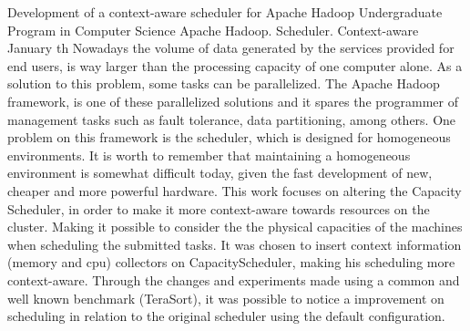 \documentclass[diss]{mdtufsm}
\begin{document}
\begin{abstract}
Hoje em dia, o volume de dados gerados é muito maior do que a capacidade de processamento dos computadores. Como solução para esse problema, algumas tarefas podem ser paralelizadas ou distribuidas. O \emph{framework Apache Hadoop} \cite{Hadoop}, é uma delas e poupa o programador as terefas de gerenciamento, como tolerância à falhas, particionamento dos dados entre outros.
Um problema no escalonador do \emph{Apache Hadoop} é que seu foco é em ambientes homogêneos, o que muitas vezes não é possível de se manter. O foco deste trabalho foi na melhora de um escalonador já existente, possuindo como objetivo torná-lo sensível ao contexto, permitindo que as capacidades físicas de cada máquina sejam consideradas na hora da distribuição das tarefas submetidas. Optou-se por inserir coletores de informações de contexto (memória e cpu) no  CapacityScheduler, tornando o comportamento desse sensível ao contexto. Através das mudanças feitas e de experimentos feitos usando um benchmark bem conhecido (TeraSort), foi possível demonstrar uma melhora no escalonamento em relação ao escalonador original com a configuração padrão.
\end{abstract}



\begin{englishabstract}
{Development of a context-aware scheduler for Apache Hadoop}
{Undergraduate Program in Computer Science}
{Apache Hadoop. Scheduler. Context-aware}
{January}
{th}
Nowadays the volume of data generated by the services provided for end users, is way larger than the processing capacity of one computer alone. As a solution to this problem, some tasks can be parallelized. The Apache Hadoop framework, is one of these parallelized solutions and it spares the programmer of management tasks such as fault tolerance, data partitioning, among others.
One problem on this framework is the scheduler, which is designed for homogeneous environments. It is worth to remember that maintaining a homogeneous environment is somewhat difficult today, given the fast development of new, cheaper and more powerful hardware. This work focuses on altering the Capacity Scheduler, in order to make it more context-aware towards resources on the cluster. Making it possible to consider the the physical capacities of the machines when scheduling the submitted tasks. It was chosen to insert context information (memory and cpu) collectors on CapacityScheduler, making his scheduling more context-aware. Through the changes and experiments made using a common and well known benchmark (TeraSort), it was possible to notice a improvement on scheduling in relation to the original scheduler using the default configuration.
\end{englishabstract}
\end{document}
